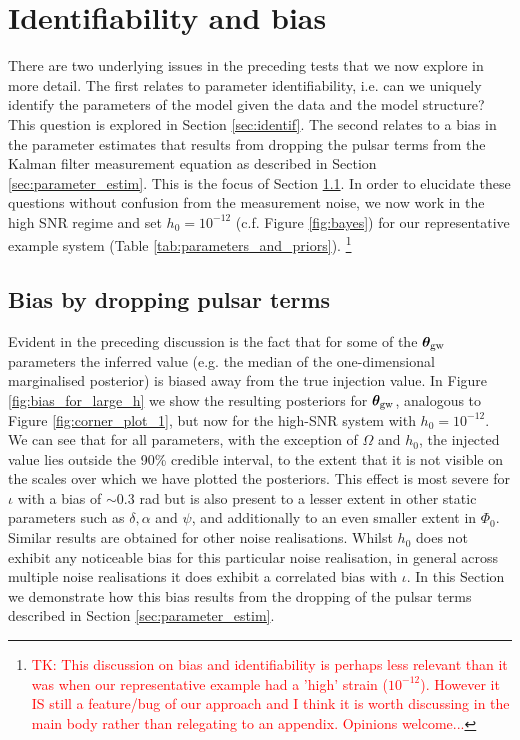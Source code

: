 \documentclass[fleqn,usenatbib,useAMS]{mnras}
\begin{document}
\section{Identifiability and bias} \label{sec:bias_and_identifiability}
There are two underlying issues in the preceding tests that we now explore in more detail. The first relates to parameter identifiability, i.e. can we uniquely identify the parameters of the model given the data and the model structure? This question is explored in Section \ref{sec:identif}. The second relates to a bias in the parameter estimates that results from dropping the pulsar terms from the Kalman filter measurement equation as described in Section \ref{sec:parameter_estim}. This is the focus of Section \ref{sec:bias}. In order to elucidate these questions without confusion from the measurement noise, we now work in the high SNR regime and set $h_0 = 10^{-12}$ (c.f. Figure \ref{fig:bayes}) for our representative example system (Table \ref{tab:parameters_and_priors}). \footnote{\tiny \textcolor{red}{TK: This discussion on bias and identifiability is perhaps less relevant than it was when our representative example had a 'high' strain ($10^{-12}$). However it IS still a feature/bug of our approach and I think it is worth discussing in the main body rather than relegating to an appendix. Opinions welcome...} \normalsize}


\subsection{Bias by dropping pulsar terms}\label{sec:bias}




Evident in the preceding discussion is the fact that for some of the $\boldsymbol{\theta}_{\rm gw}$ parameters the inferred value (e.g. the median of the one-dimensional marginalised posterior) is biased away from the true injection value. In Figure \ref{fig:bias_for_large_h} we show the resulting posteriors for $\boldsymbol{\theta}_{\rm gw}$, analogous to Figure \ref{fig:corner_plot_1}, but now for the high-SNR system with $h_0 = 10^{-12}$. We can see that for all parameters, with the exception of $\Omega$ and $h_0$, the injected value lies outside the 90\% credible interval, to the extent that it is not visible on the scales over which we have plotted the posteriors. This effect is most severe for $\iota$ with a bias of $\sim 0.3$ rad but is also present to a lesser extent in other static parameters such as $\delta,\alpha$ and $\psi$, and additionally to an even smaller extent in $\Phi_0$. Similar results are obtained for other noise realisations. Whilst $h_0$ does not exhibit any noticeable bias for this particular noise realisation, in general across multiple noise realisations it does exhibit a correlated bias with $\iota$. In this Section we demonstrate how this bias results from the dropping of the pulsar terms described in Section \ref{sec:parameter_estim}. \newline 
\end{document}
